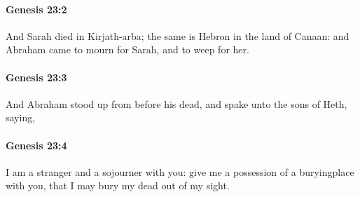 		\paragraph{Genesis 23:2} %
			\label{GENESIS-23-2}

			And Sarah died in Kirjath-arba; the same is Hebron in the land of Canaan: and Abraham came to mourn for Sarah, and to weep for her.


		\paragraph{Genesis 23:3} %
			\label{GENESIS-23-3}

			And Abraham stood up from before his dead, and spake unto the sons of Heth, saying,


		\paragraph{Genesis 23:4} %
			\label{GENESIS-23-4}

			I am a stranger and a sojourner with you: give me a possession of a buryingplace with you, that I may bury my dead out of my sight.


